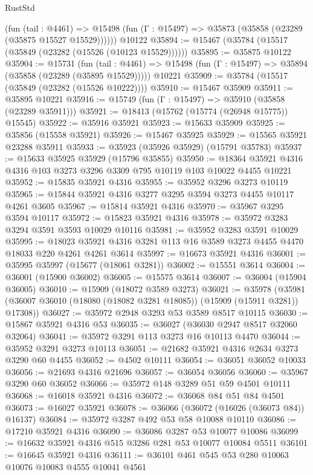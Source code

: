 \begin{lexlean}{RustStd}
\begin{coremodule}
      (fun (tail : @4461) =>
      @15498 (fun (Γ : @15497) => @35873 (@35858 (@23289 (@35875 @15527 @15529))))))
    @10122
@35894 := @15467 (@35784 (@15517 (@35849 (@23282 (@15526 (@10123 @15529))))))
@35895 := @35875 @10122
@35904 := @15731
    (fun (tail : @4461) => @15498 (fun (Γ : @15497) => @35894 (@35858 (@23289 (@35895 @15529)))))
    @10221
@35909 := @35784 (@15517 (@35849 (@23282 (@15526 @10222))))
@35910 := @15467 @35909
@35911 := @35895 @10221
@35916 := @15749 (fun (Γ : @15497) => @35910 (@35858 (@23289 @35911)))
@35921 := @18413 (@15762 (@15774 (@26948 @15775)) @15545)
@35922 := @35916 @35921
@35923 := @15633 @35909
@35925 := @35856 (@15558 @35921)
@35926 := @15467 @35925
@35929 := @15565 @35921 @23288 @35911
@35933 := @35923 (@35926 @35929) (@15791 @35783)
@35937 := @15633 @35925 @35929 (@15796 @35855)
@35950 := @18364 @35921 @4316 @4316 @103 @3273 @3296 @3309 @795 @10119 @103 @10022 @4455 @10221
@35952 := @15835 @35921 @4316
@35955 := @35952 @3296 @3273 @10119
@35965 := @15844 @35921 @4316 @3277 @3295 @3594 @3273 @4455 @10117 @4261 @3605
@35967 := @15814 @35921 @4316
@35970 := @35967 @3295 @3594 @10117
@35972 := @15823 @35921 @4316
@35978 := @35972 @3283 @3294 @3591 @3593 @10029 @10116
@35981 := @35952 @3283 @3591 @10029
@35995 := @18023 @35921 @4316 @3281 @113 @16 @3589 @3273 @4455 @4470 @18033 @220 @4261 @4261 @3614
@35997 := @16673 @35921 @4316
@36001 := @35995 @35997 (@15677 (@18061 @3281))
@36002 := @15551 @3614
@36004 := @36001 (@15900 @36002)
@36005 := @15575 @3614
@36007 := @36004 (@15904 @36005)
@36010 := @15909 (@18072 @3589 @3273)
@36021 := @35978
    (@35981 (@36007 @36010 (@18080 (@18082 @3281 @18085)) (@15909 (@15911 @3281)) @17308))
@36027 := @35972 @2948 @3293 @53 @3589 @8517 @10115
@36030 := @15867 @35921 @4316 @53
@36035 := @36027 (@36030 @2947 @8517 @32060 @32064)
@36041 := @35972 @3291 @113 @3273 @16 @10113 @4470
@36044 := @35952 @3291 @3273 @10113
@36051 := @21682 @35921 @4316 @2634 @3273 @3290 @60 @4455
@36052 := @4502 @10111
@36054 := @36051 @36052 @10033
@36056 := @21693 @4316 @21696
@36057 := @36054 @36056
@36060 := @35967 @3290 @60 @36052
@36066 := @35972 @148 @3289 @51 @59 @4501 @10111
@36068 := @16018 @35921 @4316
@36072 := @36068 @84 @51 @84 @4501
@36073 := @16027 @35921
@36078 := @36066 (@36072 (@16026 (@36073 @84)) @16137)
@36084 := @35972 @3287 @492 @53 @58 @10088 @10110
@36086 := @17210 @35921 @4316
@36090 := @36086 @3287 @53 @10077 @10086
@36099 := @16632 @35921 @4316 @515 @3286 @281 @53 @10077 @10084 @5511
@36101 := @16645 @35921 @4316
@36111 := @36101 @461 @545 @53 @280 @10063 @10076 @10083 @4555 @10041 @4561

\end{coremodule}
\end{lexlean}
